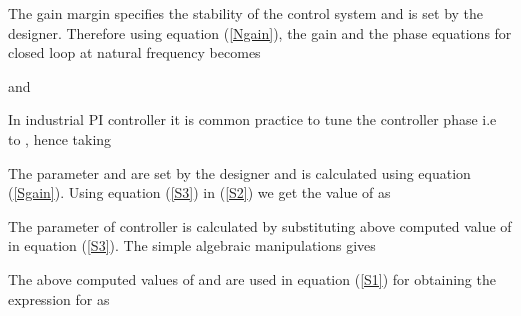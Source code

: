 \documentclass[journal]{IEEEtran}
\begin{document}
The gain margin  specifies the stability of the control system and is set by the designer. Therefore using equation (\ref{Ngain}), the gain and the phase equations for closed loop at natural frequency becomes

and

In industrial PI controller it is common practice to tune the controller phase i.e  to  \cite{Pcontrol}\cite{cntrol}, hence taking

The parameter  and  are set by the designer and  is calculated using equation (\ref{Sgain}). Using equation (\ref{S3}) in (\ref{S2}) we get the value of  as
 
The parameter  of controller is calculated by substituting above computed value of  in equation (\ref{S3}). The simple algebraic manipulations gives

The above computed values of  and  are used in equation (\ref{S1}) for obtaining the expression for  as
\end{document}
